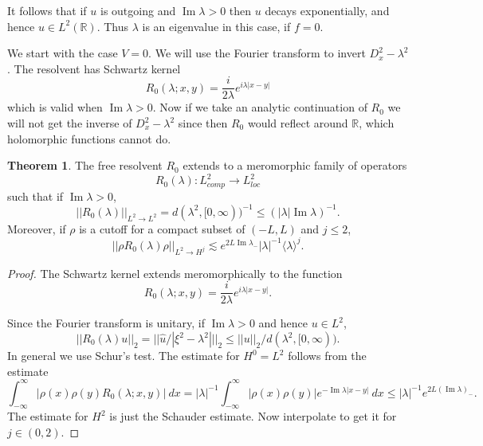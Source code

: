 \documentclass[12pt]{report}
\newcommand{\RR}{\mathbb{R}}
\renewcommand{\Im}{\operatorname{Im}}
\theoremstyle{definition}
\newtheorem{theorem}{Theorem}[chapter]
\begin{document}
It follows that if $u$ is outgoing and $\Im \lambda > 0$ then $u$ decays exponentially, and hence $u \in L^2(\RR)$.
Thus $\lambda$ is an eigenvalue in this case, if $f = 0$.

We start with the case $V = 0$. We will use the Fourier transform to invert $D_x^2 - \lambda^2$. The resolvent has Schwartz kernel
$$R_0(\lambda; x, y) = \frac{i}{2\lambda} e^{i\lambda|x-y|}$$
which is valid when $\Im \lambda > 0$.
Now if we take an analytic continuation of $R_0$ we will not get the inverse of $D_x^2 - \lambda^2$ since then $R_0$ would reflect around $\RR$, which holomorphic functions cannot do.

\begin{theorem}
The free resolvent $R_0$ extends to a meromorphic family of operators
$$R_0(\lambda): L^2_{comp} \to L^2_{loc}$$
such that if $\Im \lambda > 0$,
$$||R_0(\lambda)||_{L^2 \to L^2} = d(\lambda^2, [0, \infty))^{-1} \leq (|\lambda| \Im \lambda)^{-1}.$$
Moreover, if $\rho$ is a cutoff for a compact subset of $(-L, L)$ and $j \leq 2$,
$$||\rho R_0(\lambda) \rho||_{L^2 \to H^j} \lesssim e^{2L\Im \lambda_-}|\lambda|^{-1}\langle\lambda\rangle^j.$$
\end{theorem}
\begin{proof}
The Schwartz kernel extends meromorphically to the function
$$R_0(\lambda; x, y) = \frac{i}{2\lambda}e^{i\lambda|x-y|}.$$

Since the Fourier transform is unitary, if $\Im \lambda > 0$ and hence $u \in L^2$,
$$||R_0(\lambda)u||_2 = ||\hat u/|\xi^2 - \lambda^2|||_2 \leq ||u||_2/d(\lambda^2, [0, \infty)).$$
In general we use Schur's test. The estimate for $H^0 = L^2$ follows from the estimate
$$\int_{-\infty}^\infty |\rho(x)\rho(y)R_0(\lambda;x,y)|~dx = |\lambda|^{-1}\int_{-\infty}^\infty |\rho(x)\rho(y)|e^{-\Im \lambda|x-y|}~dx \leq |\lambda|^{-1}e^{2L(\Im \lambda)_-}.$$
The estimate for $H^2$ is just the Schauder estimate. Now interpolate to get it for $j \in (0, 2)$.
\end{proof}
\end{document}
